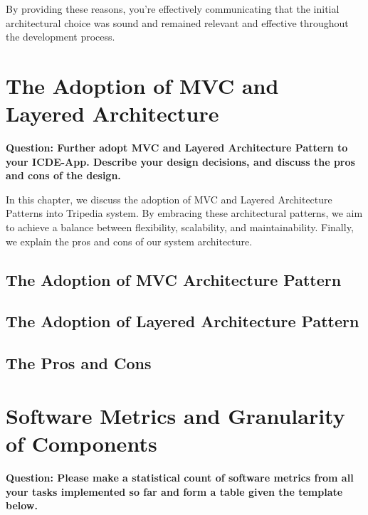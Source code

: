 \documentclass[conference]{IEEEtran}
\begin{document}
By providing these reasons, you're effectively communicating that the initial architectural choice was sound and remained relevant and effective throughout the development process.



\section{\textbf{The Adoption of MVC and Layered Architecture}}

\textbf{Question: Further adopt MVC and Layered Architecture Pattern to your ICDE-App. Describe your design
decisions, and discuss the pros and cons of the design.}

In this chapter, we discuss the adoption of MVC and Layered Architecture Patterns into Tripedia system. By embracing these architectural patterns, we aim to achieve a balance between flexibility, scalability, and maintainability. Finally, we explain the pros and cons of our system architecture.


\subsection{\textbf{The Adoption of MVC Architecture Pattern}}


\subsection{\textbf{The Adoption of Layered Architecture Pattern}}


\subsection{\textbf{The Pros and Cons}}






\section{\textbf{Software Metrics and Granularity of Components}}

\textbf{Question: Please make a statistical count of software metrics from all your tasks implemented so far and
form a table given the template below. }
\end{document}
